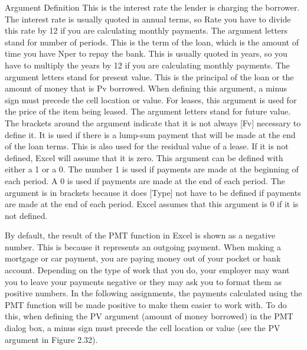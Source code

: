 Argument Definition
This is the interest rate the lender is charging the borrower. The interest rate is usually quoted in annual terms, so
Rate
you have to divide this rate by 12 if you are calculating monthly payments.
The argument letters stand for number of periods. This is the term of the loan, which is the amount of time you have
Nper      to repay the bank. This is usually quoted in years, so you have to multiply the years by 12 if you are calculating
monthly payments.
The argument letters stand for present value. This is the principal of the loan or the amount of money that is
Pv        borrowed. When defining this argument, a minus sign must precede the cell location or value. For leases, this
argument is used for the price of the item being leased.
The argument letters stand for future value. The brackets around the argument indicate that it is not always
[Fv]      necessary to define it. It is used if there is a lump-sum payment that will be made at the end of the loan terms. This is
also used for the residual value of a lease. If it is not defined, Excel will assume that it is zero.
This argument can be defined with either a 1 or a 0. The number 1 is used if payments are made at the beginning of
each period. A 0 is used if payments are made at the end of each period. The argument is in brackets because it does
[Type]
not have to be defined if payments are made at the end of each period. Excel assumes that this argument is 0 if it is
not defined.


By default, the result of the PMT function in Excel is shown as a negative number. This is because
it represents an outgoing payment. When making a mortgage or car payment, you are paying money
out of your pocket or bank account. Depending on the type of work that you do, your employer may
want you to leave your payments negative or they may ask you to format them as positive numbers.
In the following assignments, the payments calculated using the PMT function will be made positive
to make them easier to work with. To do this, when defining the PV argument (amount of money
borrowed) in the PMT dialog box, a minus sign must precede the cell location or value (see the PV
argument in Figure 2.32).

